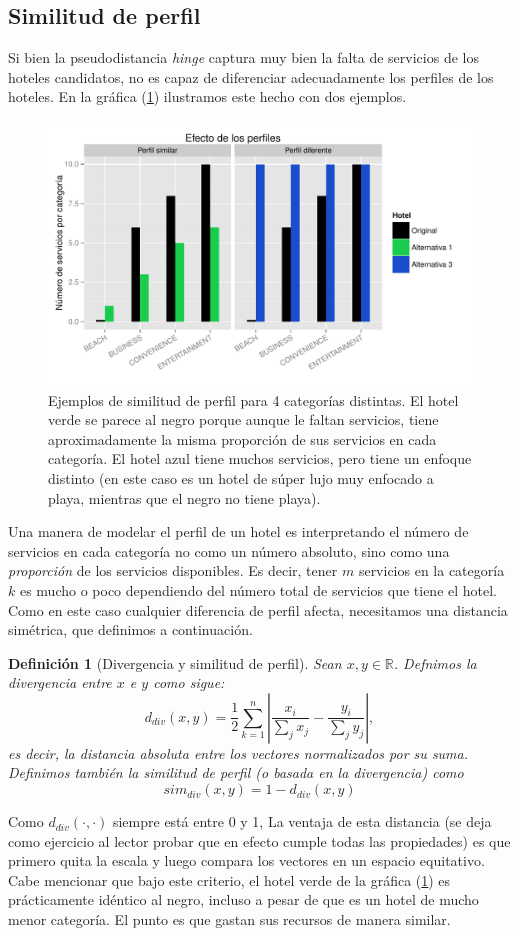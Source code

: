 \documentclass[12pt]{report}
\newcommand{\R}{\mathbb{R}}
\newtheorem{defn}{Definici\'on}[chapter]
\begin{document}
\subsection*{Similitud de perfil}

Si bien la pseudodistancia \emph{hinge} captura muy bien la falta de servicios de los hoteles candidatos, no es capaz de diferenciar adecuadamente los perfiles de los hoteles. En la gráfica (\ref{simperf}) ilustramos este hecho con dos ejemplos.
\begin{figure}[ht]
	\centering
	\includegraphics[width=\textwidth]{imagenes/simperf.pdf}
	\caption{\label{simperf} Ejemplos de similitud de perfil para 4 categorías distintas. El hotel verde se parece al negro porque aunque le faltan servicios, tiene aproximadamente la misma proporción de sus servicios en cada categoría. El hotel azul tiene muchos servicios, pero tiene un enfoque distinto (en este caso es un hotel de súper lujo muy enfocado a playa, mientras que el negro no tiene playa).}
\end{figure}
Una manera de modelar el perfil de un hotel es interpretando el número de servicios en cada categoría no como un número absoluto, sino como una \emph{proporción} de los servicios disponibles. Es decir, tener $m$ servicios en la categoría $k$ es mucho o poco dependiendo del número total de servicios que tiene el hotel. Como en este caso cualquier diferencia de perfil afecta, necesitamos una distancia simétrica, que definimos a continuación.
\begin{defn}[Divergencia y similitud de perfil]
Sean $x, y \in \R$. Defnimos la divergencia entre $x$ e $y$ como sigue:
\[
d_{div}(x, y) = \frac{1}{2}\sum_{k=1}^n \left|\frac{x_i}{\sum_j x_j} - \frac{y_i}{\sum_j y_j}\right|,
\]
es decir, la distancia absoluta entre los vectores normalizados por su suma. Definimos también la similitud de perfil (o basada en la divergencia) como
\[
sim_{div}(x,y) = 1 - d_{div}(x,y)
\]
\end{defn}
Como $d_{div}(\cdot, \cdot)$ siempre está entre 0 y 1, 
La ventaja de esta distancia (se deja como ejercicio al lector probar que en efecto cumple todas las propiedades) es que primero quita la escala y luego compara los vectores en un espacio equitativo. Cabe mencionar que bajo este criterio, el hotel verde de la gráfica (\ref{simperf}) es prácticamente idéntico al negro, incluso a pesar de que es un hotel de mucho menor categoría. El punto es que gastan sus recursos de manera similar.
\end{document}
